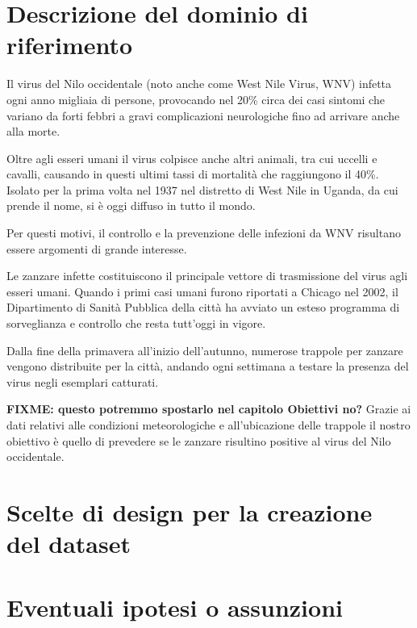 \section{Descrizione del dominio di riferimento}

Il virus del Nilo occidentale (noto anche come West Nile Virus, WNV) infetta 
ogni anno migliaia di persone, provocando nel 20\% circa dei casi sintomi che 
variano da forti febbri a gravi complicazioni neurologiche fino ad arrivare  
anche alla morte.

Oltre agli esseri umani il virus colpisce anche altri animali, tra cui 
uccelli e cavalli, causando in questi ultimi tassi di mortalità che raggiungono 
il 40\%. Isolato per la prima volta nel 1937 nel distretto di West Nile in 
Uganda, da cui prende il nome, si è oggi diffuso in tutto il mondo.

Per questi motivi, il controllo e la prevenzione delle infezioni da WNV 
risultano essere argomenti di grande interesse. 

Le zanzare infette costituiscono il principale vettore di trasmissione del 
virus agli esseri umani. Quando i primi casi umani furono riportati a Chicago 
nel 2002, il Dipartimento di Sanità Pubblica della città ha avviato un esteso 
programma di sorveglianza e controllo che resta tutt'oggi in vigore.

Dalla fine della primavera all'inizio dell'autunno, numerose trappole per 
zanzare vengono distribuite per la città, andando ogni settimana a testare la 
presenza del virus negli esemplari catturati. 

\textbf{FIXME: questo potremmo spostarlo nel capitolo Obiettivi no?} Grazie ai 
dati relativi alle condizioni meteorologiche e all'ubicazione delle trappole il 
nostro obiettivo è quello di prevedere se le zanzare risultino positive al 
virus del Nilo occidentale.





\section{Scelte di design per la creazione del dataset}

\section{Eventuali ipotesi o assunzioni}

